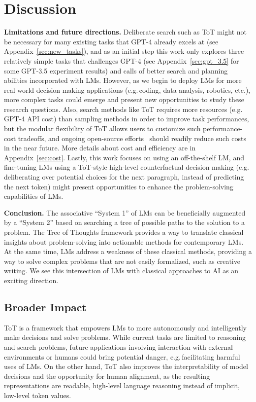 \section{Discussion}

\textbf{Limitations and future directions.} Deliberate search such as ToT might not be necessary for many existing tasks that GPT-4 already excels at (see Appendix~\ref{sec:new_tasks}), and as an initial step this work only explores three relatively simple tasks that challenges GPT-4 (see Appendix~\ref{sec:gpt_3.5} for some GPT-3.5 experiment results) and calls of better search and planning abilities incorporated with LMs. However, as we begin to deploy LMs for more real-world decision making applications (e.g.\,coding, data analysis, robotics, etc.), more complex tasks could emerge and present new opportunities to study these research questions. Also, search methods like ToT requires more resources (e.g.\,GPT-4 API cost) than sampling methods in order to improve task performances, but the modular flexibility of ToT allows users to customize such performance-cost tradeoffs, and ongoing open-source efforts~\citep{touvron2023llama} should readily reduce such costs in the near future. More details about cost and efficiency are in Appendix~\ref{sec:cost}. Lastly, this work focuses on using an off-the-shelf LM, and fine-tuning LMs using a ToT-style high-level counterfactual decision making (e.g.\,deliberating over potential choices for the next paragraph, instead of predicting the next token) might present opportunities to enhance the problem-solving capabilities of LMs.

\textbf{Conclusion.} The associative ``System 1'' of LMs can be beneficially augmented by a ``System 2'' based on searching a tree of possible paths to the solution to a problem. The Tree of Thoughts framework provides a way to translate classical insights about problem-solving into actionable methods for contemporary LMs. At the same time, LMs address a weakness of these classical methods, providing a way to solve complex problems that are not easily formalized, such as creative writing. We see this intersection of LMs with classical approaches to AI as an exciting direction.

\subsection*{Broader Impact} ToT is a framework that empowers LMs to more autonomously and intelligently make decisions and solve problems. While current tasks are limited to reasoning and search problems, future applications involving interaction with external environments or humans could bring potential danger, e.g.\,facilitating harmful uses of LMs. On the other hand, ToT also improves the interpretability of model decisions and the opportunity for human alignment, as the resulting representations are readable, high-level language reasoning instead of implicit, low-level token values. 


